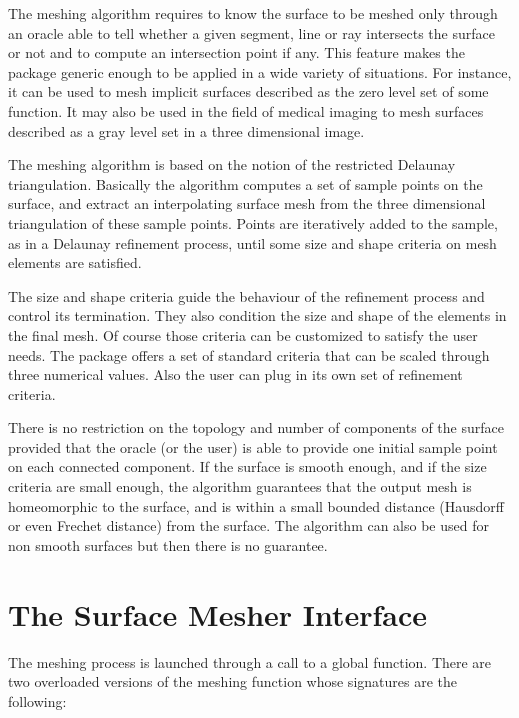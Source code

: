 The meshing algorithm requires to know the surface to be meshed
only  through an oracle able to  tell whether a
given segment, line or ray intersects the surface or not
and to compute an intersection point if any.
This feature makes the package generic enough to be
applied in a wide variety of situations. For instance, it can be
used to mesh implicit surfaces described as the zero level set
of some function. It may also be used in the field of medical imaging
to mesh surfaces described as a gray
level set in a three dimensional image.


The meshing algorithm is based on the notion of the restricted
Delaunay triangulation. Basically the algorithm  computes a set of
sample points on the surface, and extract an interpolating 
surface mesh  from the three dimensional triangulation of these 
sample points. Points are iteratively added to the sample,
as in a Delaunay refinement process, until some size and shape
criteria on mesh elements are satisfied. 


The size and shape criteria guide the  behaviour of
the refinement process and control its termination.
They also condition  the size and shape of the elements in the final
mesh. Of course those criteria can be customized to satisfy
the user needs. The  package offers
a set of standard criteria that can be scaled through
three numerical values. Also the user can plug in its own 
set of refinement criteria.

There is no restriction on the topology and number of components
of the surface provided that the oracle (or the user)
is able to provide one initial sample point on each connected component.
If the surface is smooth enough, and if the size criteria are
small enough, the algorithm guarantees 
that the output mesh is homeomorphic to the
surface, and  is within a small bounded distance
(Hausdorff or even Frechet distance) from the surface.
The algorithm can also be used for non smooth surfaces
but then there is no guarantee. 




\section{The Surface Mesher Interface}
\label{SurfaceMesher_section_interface}

The meshing process is launched through a call to a global function.
There are two overloaded versions of the meshing function
whose signatures are the following:

